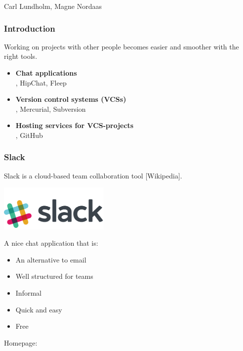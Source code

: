 \documentclass{fenicscourse}
\begin{document}
              {Carl Lundholm, Magne Nordaas}

\begin{frame}
  \frametitle{Introduction}

  Working on projects with other people becomes easier and smoother
  with the right tools.

  \bigskip

  \begin{itemize}
    \item \textbf{Chat applications} \\
      \textbf{}, HipChat, Fleep \\
    \item \textbf{Version control systems (VCSs)} \\
      \textbf{}, Mercurial, Subversion \\
    \item \textbf{Hosting services for VCS-projects} \\
      \textbf{}, GitHub \\
  \end{itemize}
\end{frame}

\begin{frame}
  \frametitle{Slack}

  Slack is a cloud-based team collaboration tool [Wikipedia].

  \begin{center}
    \includegraphics[width=0.4\textwidth]{png/slack_logo.png}
  \end{center}

  A nice chat application that is:
  \begin{itemize}
    \item An alternative to email
    \item Well structured for teams
    \item Informal
    \item Quick and easy
    \item Free
  \end{itemize}

  \bigskip

  Homepage: 
\end{frame}
\end{document}
